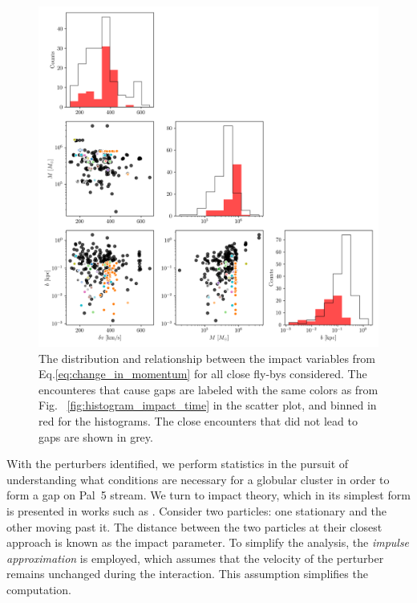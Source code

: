 \documentclass{aa}
\begin{document}
    \begin{figure}
      \centering
      \includegraphics[width=\linewidth]{impact_geometry_statistics.png}
      \caption{The distribution and relationship between the impact variables from Eq.\ref{eq:change_in_momentum} for all close fly-bys considered. The encounteres that cause gaps are labeled with the same colors as from Fig.~
      \ref{fig:histogram_impact_time} in the scatter plot, and binned in red for the histograms. The close encounters that did not lead to gaps are shown in grey. }
      \label{fig:impact_geometry_statistics}    
    \end{figure}



    With the perturbers identified, we perform statistics in the pursuit of understanding what conditions are necessary for a globular cluster in order to form a gap on Pal~5 stream. We turn to impact theory, which in its simplest form is presented in works such as \citet{2008gady.book.....B}. Consider two particles: one stationary and the other moving past it. The distance between the two particles at their closest approach is known as the impact parameter. To simplify the analysis, the \textit{impulse approximation} is employed, which assumes that the velocity of the perturber remains unchanged during the interaction. This assumption simplifies the computation.
\end{document}
